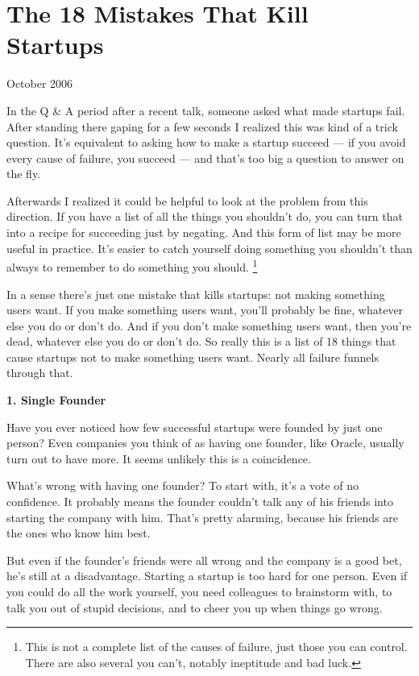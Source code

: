 \chapter{The 18 Mistakes That Kill Startups}

October 2006

In the Q \& A period after a recent talk, someone asked what made
startups fail. After standing there gaping for a few seconds I realized
this was kind of a trick question. It's equivalent to asking how to make
a startup succeed --- if you avoid every cause of failure, you succeed
--- and that's too big a question to answer on the fly.

Afterwards I realized it could be helpful to look at the problem from
this direction. If you have a list of all the things you shouldn't do,
you can turn that into a recipe for succeeding just by negating. And
this form of list may be more useful in practice. It's easier to catch
yourself doing something you shouldn't than always to remember to do
something you should. \footnote{This is not a complete list of the causes of failure, just those
you can control. There are also several you can't, notably ineptitude
and bad luck.}

In a sense there's just one mistake that kills startups: not making
something users want. If you make something users want, you'll probably
be fine, whatever else you do or don't do. And if you don't make
something users want, then you're dead, whatever else you do or don't
do. So really this is a list of 18 things that cause startups not to
make something users want. Nearly all failure funnels through that.

\textbf{1. Single Founder}

Have you ever noticed how few successful startups were founded by just
one person? Even companies you think of as having one founder, like
Oracle, usually turn out to have more. It seems unlikely this is a
coincidence.

What's wrong with having one founder? To start with, it's a vote of no
confidence. It probably means the founder couldn't talk any of his
friends into starting the company with him. That's pretty alarming,
because his friends are the ones who know him best.

But even if the founder's friends were all wrong and the company is a
good bet, he's still at a disadvantage. Starting a startup is too hard
for one person. Even if you could do all the work yourself, you need
colleagues to brainstorm with, to talk you out of stupid decisions, and
to cheer you up when things go wrong.

